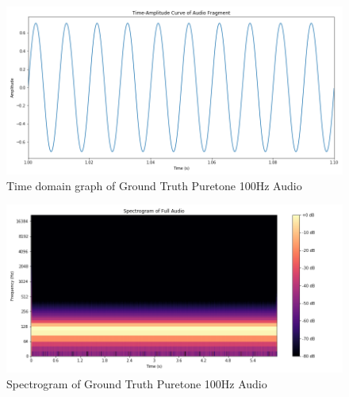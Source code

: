 \documentclass{ioereport}
\begin{document}
    \begin{figure}[H]
        \centering
        \includegraphics[width=\linewidth]{assets/audio_results/puretone100hztime.png}
        \caption{Time domain graph of Ground Truth Puretone 100Hz Audio}
        \label{fig:gt-pure100-time}
    \end{figure}
    \begin{figure}[H]
        \centering
        \includegraphics[width=\linewidth]{assets/audio_results/puretone100hzspec.png}
        \caption{Spectrogram of Ground Truth Puretone 100Hz Audio}
        \label{fig:gt-pure100-spec}
    \end{figure}
    
\end{document}
